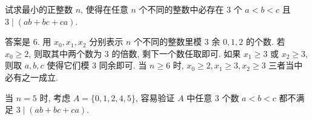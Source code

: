 \begin{prob}
\label{prob:prob-9}
试求最小的正整数 $n$, 使得在任意 $n$ 个不同的整数中必存在
$3$ 个 $a < b < c$ 且 $3 \mid (ab + bc + ca)$.
\end{prob}

\begin{soln}
答案是 $\boxed{6.}$ 用 $x_0, x_1, x_2$ 分别表示
$n$ 个不同的整数里模 $3$ 余 $0, 1, 2$ 的个数.
若 $x_0 \ge 2$, 则取其中两个数为 $3$ 的倍数, 剩下一个数任取即可.
如果 $x_1 \ge 3$ 或 $x_2 \ge 3$, 则取 $a, b, c$ 使得它们模 $3$ 同余即可.
当 $n \ge 6$ 时, $x_0 \ge 2, x_1 \ge 3, x_2 \ge 3$ 三者当中必有之一成立.

\bigskip

当 $n = 5$ 时, 考虑 $A = \{0, 1, 2, 4, 5\}$,
容易验证 $A$ 中任意 $3$ 个数 $a < b < c$ 都不满足 $3 \mid (ab + bc + ca)$.
\end{soln}
